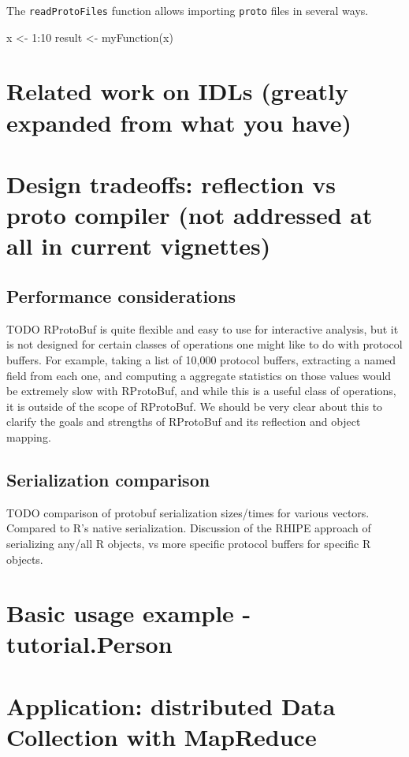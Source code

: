 The \texttt{readProtoFiles} function allows importing \texttt{proto}
files in several ways.

\begin{example}
  x <- 1:10
  result <- myFunction(x)
\end{example}

\section{Related work on IDLs (greatly expanded from what you have)}

\section{Design tradeoffs: reflection vs proto compiler (not addressed
  at all in current vignettes)}

\subsection{Performance considerations}

TODO RProtoBuf is quite flexible and easy to use for interactive
analysis, but it is not designed for certain classes of operations one
might like to do with protocol buffers.  For example, taking a list of
10,000 protocol buffers, extracting a named field from each one, and
computing a aggregate statistics on those values would be extremely
slow with RProtoBuf, and while this is a useful class of operations,
it is outside of the scope of RProtoBuf.  We should be very clear
about this to clarify the goals and strengths of RProtoBuf and its
reflection and object mapping.

\subsection{Serialization comparison}

TODO comparison of protobuf serialization sizes/times for various vectors.  Compared to R's native serialization.  Discussion of the RHIPE approach of serializing any/all R objects, vs more specific protocol buffers for specific R objects.

\section{Basic usage example - tutorial.Person}

\section{Application: distributed Data Collection with MapReduce}

